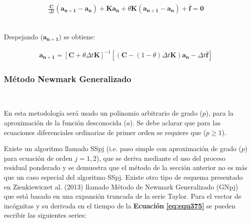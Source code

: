 \begin{ceqn} %
\begin{gather}\label{eq:equ384}
\frac{\mathbf{C}}{\Delta t}(\mathbf{a_{n+1}} - \mathbf{a_n}) + \mathbf{K}\mathbf{a_n}
+ \theta\mathbf{K}(\mathbf{a_{n+1}} - \mathbf{a_n}) + \mathbf{\overline{f}} = \mathbf{0}
\end{gather}   
\end{ceqn}
\\
Despejando ($\mathbf{a_{n+1}}$) se obtiene:

\begin{ceqn} %
\begin{gather}\label{eq:equ385}
\mathbf{a_{n+1}} = [\mathbf{C} + \theta\Delta t \mathbf{K}]^{-1}[(\mathbf{C} - (1-\theta)\Delta t \mathbf{K})\mathbf{a_n} - \Delta t \mathbf{\overline{f}}]
\end{gather}   
\end{ceqn}


\subsubsection{Método Newmark Generalizado}~\hypertarget{sec:sec3422}{}
\label{sec:sec3422}

En esta metodología será usado un polinomio arbitrario de grado ($p$), para la aproximación de la función desconocida ($a$). Se debe aclarar que para las ecuaciones diferenciales ordinarias de primer orden se requiere que ($p\geq1$).\bigskip

Existe un algoritmo llamado SSpj (i.e. paso simple con aproximación de grado ($p$) para ecuación de orden $j=1,2$), que se deriva mediante el uso del proceso residual ponderado y se demuestra que el método de la sección anterior no es más que un caso especial del algoritmo SSpj. Existe otro tipo de esquema presentado en Zienkiewiczet al. (2013) \cite{Zienkiewicz2013TheFundamentals} llamado Método de Newmark Generalizado (GNpj) que está basado en una expansión truncada de la serie Taylor. Para el vector de incógnitas y su derivada en el tiempo de la \textbf{Ecuación} \textbf{\ref{eq:equ375}} se pueden escribir las siguientes series:\bigskip

